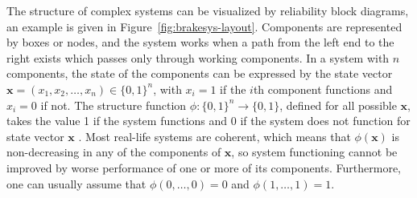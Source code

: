 \documentclass[Journal,SectionNumbers,SingleSpace,InsideFigs]{ascelike}
\renewcommand{\vec}[1]{{\bm#1}}
\begin{document}
The structure of complex systems can be visualized by reliability block diagrams,
an example is given in Figure~\ref{fig:brakesys-layout}.
Components are represented by boxes or nodes,
and the system works when a path from the left end to the right exists
which passes only through working components.
In a system with $n$ components, the state of the components can be expressed by the state vector
$\vec{x} = (x_1,x_2,\ldots,x_n) \in \{0,1\}^n$, with $x_i=1$ if the $i$th component functions 
and $x_i=0$ if not.
The structure function $\phi : \{0,1\}^n \rightarrow \{0,1\}$, defined for all possible $\vec{x}$, takes 
the value 1 if the system functions and 0 if the system does not function for state vector $\vec{x}$
\cite{BP75}.
Most real-life systems are coherent,
which means that $\phi(\vec{x})$ is non-decreasing in any of the components of $\vec{x}$,
so system functioning cannot be improved by worse performance of one or more of its components.
Furthermore, one can usually assume that $\phi(0, \ldots, 0) = 0$ and $\phi(1, \ldots, 1) = 1$.
\end{document}
